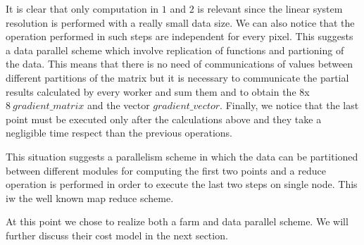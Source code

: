 It is clear that only computation in $1$ and $2$ is relevant since the linear system resolution is performed with a really small data size.
We can also notice that the operation performed in such steps are independent for every pixel.
This suggests a data parallel scheme which involve replication of functions and partioning of the data.
This means that there is no need of communications of values between different partitions of the matrix but it is necessary to communicate the partial results calculated by every worker and sum them and to obtain the $8$x$8\ gradient\_matrix$ and the vector $gradient\_vector$. 
Finally, we notice that the last point must be executed only after the calculations above and they take a negligible time respect than the previous operations.

This situation suggests a parallelism scheme in which the data can be partitioned between different modules for computing the first two points and a reduce operation is performed in order to execute the last two steps on single node. 
This iw the well known map reduce scheme.

At this point we chose to realize both a farm and data parallel scheme. We will further discuss their cost model in the next section.